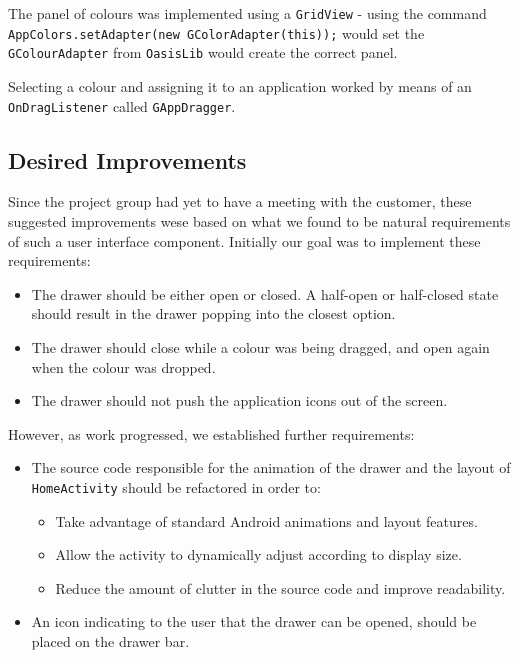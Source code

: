 The panel of colours was implemented using a \lstinline{GridView} - using the command \lstinline{AppColors.setAdapter(new GColorAdapter(this));} would set the \lstinline{GColourAdapter} from \lstinline{OasisLib} would create the correct panel.

Selecting a colour and assigning it to an application worked by means of an \lstinline{OnDragListener} called \lstinline{GAppDragger}.

\subsection{Desired Improvements}

Since the project group had yet to have a meeting with the customer, these suggested improvements wese based on what we found to be natural requirements of such a user interface component. Initially our goal was to implement these requirements:

\begin{itemize}
\item The drawer should be either open or closed. A half-open or half-closed state should result in the drawer popping into the closest option.
\item The drawer should close while a colour was being dragged, and open again when the colour was dropped.
\item The drawer should not push the application icons out of the screen.
\end{itemize}

However, as work progressed, we established further requirements:

\begin{itemize}
\item The source code responsible for the animation of the drawer and the layout of \lstinline{HomeActivity} should be refactored in order to:
\begin{itemize}
\item Take advantage of standard Android animations and layout features.
\item Allow the activity to dynamically adjust according to display size.
\item Reduce the amount of clutter in the source code and improve readability.
\end{itemize}
\item An icon indicating to the user that the drawer can be opened, should be placed on the drawer bar.
\end{itemize}

